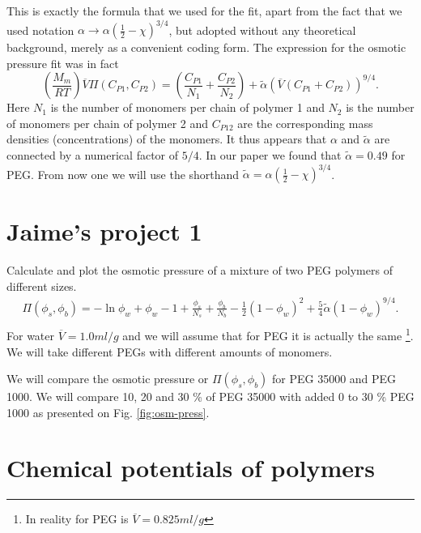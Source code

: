 \documentclass[11pt,a4paper]{article}
\begin{document}
This is exactly the formula that we used for the fit, apart from the fact that we used notation $\alpha \longrightarrow \alpha \left( {\textstyle\frac12} - \chi\right)^{3/4}$, but adopted without any theoretical background, merely as a convenient coding form. 
The expression for the osmotic pressure fit was in fact
\begin{equation}
\left( \frac{M_m}{R T}\right) \overline{V}  \Pi (C_{P1}, C_{P2})  = \left( \frac{C_{P1}}{N_1} + \frac{C_{P2}}{N_2}\right) + \tilde\alpha   \left( \overline{V} (C_{P1} + C_{P2})\right)^{9/4}.
\label{eq2}
\end{equation}
Here $N_1$ is the number of monomers per chain of polymer 1 and $N_2$ is the number of monomers per chain of polymer 2 and $C_{P12}$ are the corresponding mass densities (concentrations) of the monomers. It thus appears that $\alpha$ and $\tilde\alpha$ are connected by a numerical factor of $5/4$. In our paper we found that $\tilde\alpha = 0.49$ for PEG. From now one we will use the shorthand $\tilde\alpha = \alpha \left( {\textstyle\frac12} - \chi\right)^{3/4} $.

\section{Jaime's project 1}

Calculate and plot the osmotic pressure of a mixture of two PEG polymers of different sizes. 
\begin{eqnarray}
\Pi(\phi_s, \phi_b) =-  \ln{\phi_w} + \phi_w -1 + \frac{\phi_s}{N_s} + \frac{\phi_b}{N_b}  - {\textstyle\frac12}\left(1-\phi_w \right)^{2} + {\textstyle\frac{5}{4}} \tilde\alpha  \left( 1-\phi_w\right)^{9/4}. \nonumber\\
~
\label{plothis2}
\end{eqnarray}
For water ${\overline V} = 1.0 ml/g$ and we will assume that for PEG it is actually the same \footnote{In reality for PEG is ${\overline V} = 0.825 ml/g$ }. We will take different PEGs with different amounts of monomers. 

We will compare the osmotic pressure or $\Pi(\phi_s, \phi_b)$ for PEG 35000 and PEG 1000. We will compare 10, 20 and 30 \% of PEG 35000 with added 0 to 30 \% PEG 1000 as presented on Fig. \ref{fig:osm-press}.


\section{Chemical potentials of polymers}
\end{document}

